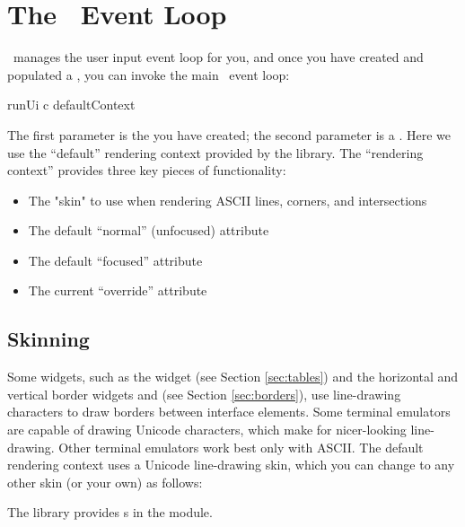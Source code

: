 \section{The \vtyui\ Event Loop}
\label{sec:event_loop}

\vtyui\ manages the user input event loop for you, and once you have
created and populated a , you can invoke the main
\vtyui\ event loop:

\begin{haskellcode}
 runUi c defaultContext
\end{haskellcode}

The first parameter is the  you have created; the
second parameter is a .  Here we use the
``default'' rendering context provided by the library.  The
``rendering context'' provides three key pieces of functionality:

\begin{itemize}
\item The "skin" to use when rendering ASCII lines, corners, and
      intersections
\item The default ``normal'' (unfocused) attribute
\item The default ``focused'' attribute
\item The current ``override'' attribute
\end{itemize}

\subsection{Skinning}
\label{sec:skinning}

Some widgets, such as the  widget (see Section
\ref{sec:tables}) and the horizontal and vertical border widgets
 and  (see Section \ref{sec:borders}), use
line-drawing characters to draw borders between interface elements.
Some terminal emulators are capable of drawing Unicode characters,
which make for nicer-looking line-drawing.  Other terminal emulators
work best only with ASCII.  The default rendering context uses a
Unicode line-drawing skin, which you can change to any other skin (or
your own) as follows:


The library provides s in the  module.


